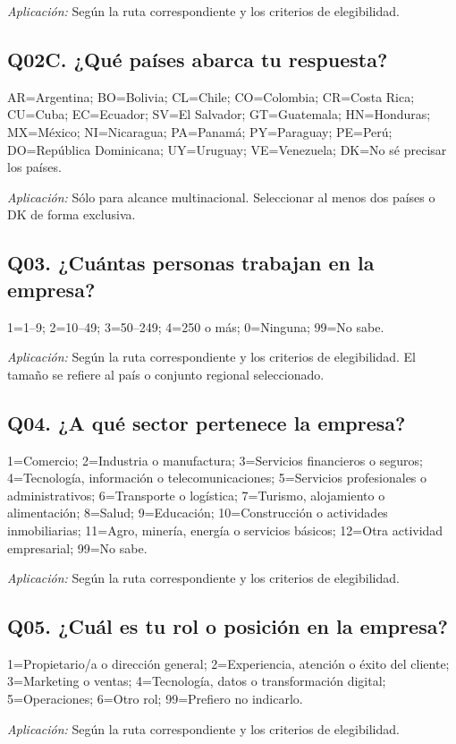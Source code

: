 \documentclass[12pt,letterpaper]{article}
\begin{document}
\emph{Aplicación:} Según la ruta correspondiente y los criterios de elegibilidad.

\subsection*{Q02C. ¿Qué países abarca tu respuesta?}
AR=Argentina; BO=Bolivia; CL=Chile; CO=Colombia; CR=Costa Rica; CU=Cuba; EC=Ecuador; SV=El Salvador; GT=Guatemala; HN=Honduras; MX=México; NI=Nicaragua; PA=Panamá; PY=Paraguay; PE=Perú; DO=República Dominicana; UY=Uruguay; VE=Venezuela; DK=No sé precisar los países.

\emph{Aplicación:} Sólo para alcance multinacional. Seleccionar al menos dos países o DK de forma exclusiva.

\subsection*{Q03. ¿Cuántas personas trabajan en la empresa?}
1=1--9; 2=10--49; 3=50--249; 4=250 o más; 0=Ninguna; 99=No sabe.

\emph{Aplicación:} Según la ruta correspondiente y los criterios de elegibilidad. El tamaño se refiere al país o conjunto regional seleccionado.

\subsection*{Q04. ¿A qué sector pertenece la empresa?}
1=Comercio; 2=Industria o manufactura; 3=Servicios financieros o seguros; 4=Tecnología, información o telecomunicaciones; 5=Servicios profesionales o administrativos; 6=Transporte o logística; 7=Turismo, alojamiento o alimentación; 8=Salud; 9=Educación; 10=Construcción o actividades inmobiliarias; 11=Agro, minería, energía o servicios básicos; 12=Otra actividad empresarial; 99=No sabe.

\emph{Aplicación:} Según la ruta correspondiente y los criterios de elegibilidad.

\subsection*{Q05. ¿Cuál es tu rol o posición en la empresa?}
1=Propietario/a o dirección general; 2=Experiencia, atención o éxito del cliente; 3=Marketing o ventas; 4=Tecnología, datos o transformación digital; 5=Operaciones; 6=Otro rol; 99=Prefiero no indicarlo.

\emph{Aplicación:} Según la ruta correspondiente y los criterios de elegibilidad.
\end{document}
